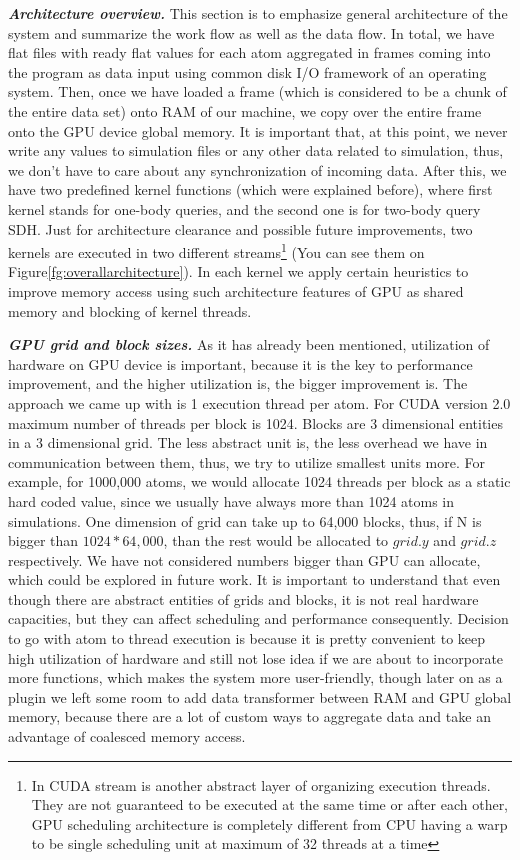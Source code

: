\documentclass[11pt,a4paper]{report}
\begin{document}
\emph{\textbf{Architecture overview.}}
This section is to emphasize general architecture of the system and summarize the work flow as well as the data flow. In total, we have flat files with ready flat values for each atom aggregated in frames coming into the program as data input using common disk I/O framework of an operating system. Then, once we have loaded a frame (which is considered to be a chunk of the entire data set) onto RAM of our machine, we copy over the entire frame onto the GPU device global memory. It is important that, at this point, we never write any values to simulation files or any other data related to simulation, thus, we don't have to care about any synchronization of incoming data. After this, we have two predefined kernel functions (which were explained before), where first kernel stands for one-body queries, and the second one is for two-body query SDH. Just for architecture clearance and possible future improvements, two kernels are executed in two different streams\footnote{In CUDA stream is another abstract layer of organizing execution threads. They are not guaranteed to be executed at the same time or after each other, GPU scheduling architecture is completely different from CPU having a warp to be single scheduling unit at maximum of 32 threads at a time} (You can see them on Figure\ref{fg:overallarchitecture}). In each kernel we apply certain heuristics to improve memory access using such architecture features of GPU as shared memory and blocking of kernel threads.


\emph{\textbf{GPU grid and block sizes.}} As it has already been mentioned, utilization of hardware on GPU device is important, because it is the key to performance improvement, and the higher utilization is, the bigger improvement is.
The approach we came up with is 1 execution thread per atom. For CUDA version 2.0 maximum number of threads per block is 1024. Blocks are 3 dimensional entities in a 3 dimensional grid. The less abstract unit is, the less overhead we have in communication between them, thus, we try to utilize smallest units more. For example, for 1000,000 atoms, we would allocate 1024 threads per block as a static hard coded value, since we usually have always more than 1024 atoms in simulations. One dimension of grid can take up to 64,000 blocks, thus, if N is bigger than $1024 * 64,000$, than the rest would be allocated to $grid.y$ and $grid.z$ respectively. We have not considered numbers bigger than GPU can allocate, which could be explored in future work. It is important to understand that even though there are abstract entities of grids and blocks, it is not real hardware capacities, but they can affect scheduling and performance consequently. Decision to go with atom to thread execution is because it is pretty convenient to keep high utilization of hardware and still not lose idea if we are about to incorporate more functions, which makes the system more user-friendly, though later on as a plugin we left some room to add data transformer between RAM and GPU global memory, because there are a lot of custom ways to aggregate data and take an advantage of coalesced memory access.
\end{document}
